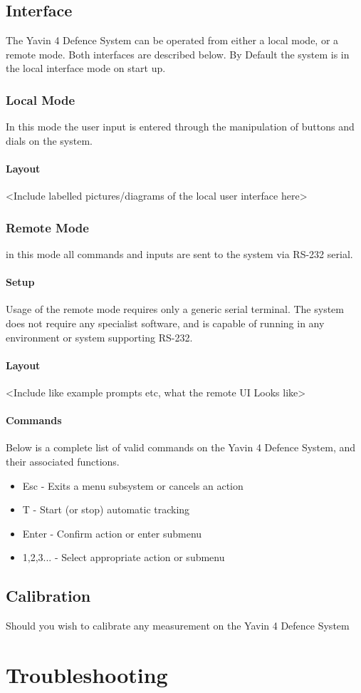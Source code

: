 \documentclass[]{report}
\begin{document}
\section{Interface}
The Yavin 4 Defence System can be operated from either a local mode, or a remote mode. Both interfaces are described below. By Default the system is in the local interface mode on start up.

\subsection{Local Mode}
In this mode the user input is entered through the manipulation of buttons and dials on the system.

\subsubsection{Layout}
<Include labelled pictures/diagrams of the local user interface here>

\subsection{Remote Mode}
in this mode all commands and inputs are sent to the system via RS-232 serial.

\subsubsection{Setup}
Usage of the remote mode requires only a generic serial terminal. The system does not require any specialist software, and is capable of running in any environment or system supporting RS-232.

\subsubsection{Layout}
<Include like example prompts etc, what the remote UI Looks like>

\subsubsection{Commands}
Below is a complete list of valid commands on the Yavin 4 Defence System, and their associated functions.

\begin{itemize}
	\item Esc - Exits a menu subsystem or cancels an action
	\item T - Start (or stop) automatic tracking
	\item Enter - Confirm action or enter submenu
	\item 1,2,3... - Select appropriate action or submenu
\end{itemize}

\section{Calibration}
Should you wish to calibrate any measurement on the Yavin 4 Defence System 

\chapter{Troubleshooting}
\end{document}
